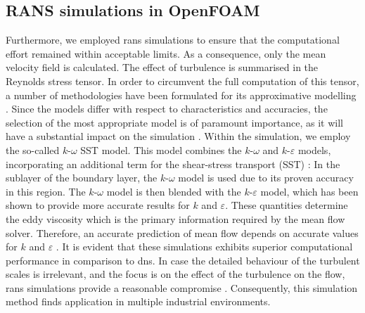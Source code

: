 \subsection{RANS simulations in OpenFOAM}\label{sec:RANSmethod}
Furthermore, we employed \acrshort{rans} simulations to ensure that the computational effort remained within acceptable limits.
As a consequence, only the mean velocity field is calculated.
The effect of turbulence is summarised in the Reynolds stress tensor.
In order to circumvent the full computation of this tensor, a number of methodologies have been formulated for its approximative modelling \citep{wilcox_turbulence_2006}. 
Since the models differ with respect to  characteristics and accuracies, the selection of   the most appropriate model is of paramount importance,  as it will have a substantial impact on the simulation \citep{yang_assessment_2016}.
Within the simulation, we employ the so-called $k\text{-}\omega$ SST model.
This model combines the $k\text{-}\omega$ and $k\text{-}\varepsilon$ models, incorporating an additional term for the shear-stress transport (SST) \citep{menter_two-equation_1994}:
In the sublayer of the boundary layer, the $k\text{-}\omega$ model is used due to its proven accuracy in this region. 
The $k\text{-}\omega$ model is then blended with the $k\text{-}\varepsilon$ model, which has been shown to provide more accurate results for $k$ and $\varepsilon$.
These quantities determine the eddy viscosity which is the primary information required by the mean flow solver. 
Therefore, an accurate prediction of mean flow depends on accurate values for $k$ and $\varepsilon$ \citep{menter_two-equation_1994}.
It is evident that these simulations exhibits superior computational  performance in comparison to \acrshort{dns}.
In case the detailed behaviour of the turbulent scales is irrelevant, and the focus is on the effect of the turbulence on the flow, \acrshort{rans} simulations provide a reasonable compromise \citep{alfonsi_reynolds-averaged_2009}.
Consequently, this simulation method finds application in multiple industrial environments.


